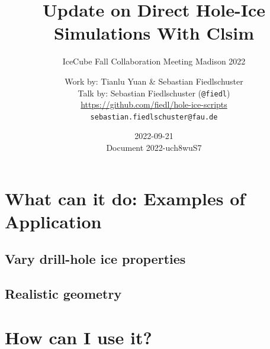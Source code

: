 \documentclass[green, 12pt]{beamer}
\title[Update on Direct Hole-Ice Simulations With Clsim | Madison Collaboration Meeting 2022]{Update on Direct Hole-Ice Simulations With Clsim}
\subtitle{IceCube Fall Collaboration Meeting Madison 2022}
\date{2022-09-21 \\ \vspace*{2mm}\tiny{Document 2022-uch8wuS7} \normalsize}
\author[Sebastian Fiedlschuster, ECAP Erlangen, 2022-09-21]{Work by: Tianlu Yuan \& Sebastian Fiedlschuster \vspace*{5mm} \\ Talk by: Sebastian Fiedlschuster (\texttt{@fiedl}) \\ \tiny{\url{https://github.com/fiedl/hole-ice-scripts}} \\ \tiny\texttt{sebastian.fiedlschuster@fau.de}}
\institute{Erlangen Centre for Astroparticle Physics}
\newif\ifplacelogo %
\begin{document}



\placelogofalse



%   

% 
% 
% 
\section{What can it do: Examples of Application}
\subsection{Vary drill-hole ice properties}
  
\subsection{Realistic geometry}
  
%  
%  
%  

%   

\section{How can I use it?}
  
\end{document}
